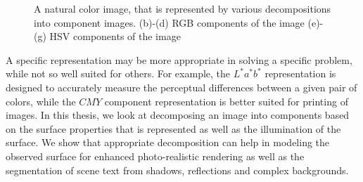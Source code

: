 \begin{figure}[t]
{\label{fig:subfig12}
}
\caption
{A natural color image, that is represented by various decompositions into component images.
(b)-(d) RGB components of the image (e)-(g) HSV components of the image}
\label{fig:imageComponents}
\end{figure}

A specific representation may be more appropriate in solving a specific problem, while not so well suited for
others. For example, the $L^*a^*b^*$ representation is designed to accurately measure the perceptual differences between
a given pair of colors, while the $CMY$ component representation is better suited for printing of images. In this
thesis, we look at decomposing an image into components based on the surface properties that is represented as well
as the illumination of the surface. We show that appropriate decomposition can help in modeling the observed surface
for enhanced photo-realistic rendering as well as the segmentation of scene text from shadows, reflections and 
complex backgrounds.

\label{sec:intro}
